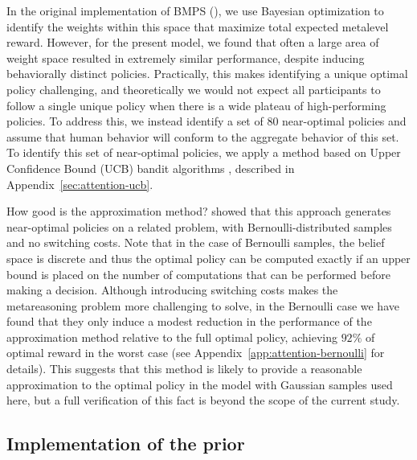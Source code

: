 In the original implementation of BMPS (\citet{callaway2018learning}), we use Bayesian optimization to identify the weights within this space that maximize total expected metalevel reward. However, for the present model, we found that often a large area of weight space resulted in extremely similar performance, despite inducing behaviorally distinct policies. Practically, this makes identifying a unique optimal policy challenging, and theoretically we would not expect all participants to follow a single unique policy when there is a wide plateau of high-performing policies. To address this, we instead identify a set of 80 near-optimal policies and assume that human behavior will conform to the aggregate behavior of this set. To identify this set of near-optimal policies, we apply a method based on Upper Confidence Bound (UCB) bandit algorithms \citep{auer2002finite}, described in Appendix~\ref{sec:attention-ucb}.

How good is the approximation method? \citet{callaway2018learning} showed that this approach generates near-optimal policies on a related problem, with Bernoulli-distributed samples and no switching costs. Note that in the case of Bernoulli samples, the belief space is discrete and thus the optimal policy can be computed exactly if an upper bound is placed on the number of computations that can be performed before making a decision. Although introducing switching costs makes the metareasoning problem more challenging to solve, in the Bernoulli case we have found that they only induce a modest reduction in the performance of the approximation method relative to the full optimal policy, achieving $92\%$ of optimal reward in the worst case (see Appendix~\ref{app:attention-bernoulli} for details). This suggests that this method is likely to provide a reasonable approximation to the optimal policy in the model with Gaussian samples used here, but a full verification of this fact is beyond the scope of the current study.


\subsection{Implementation of the prior}

